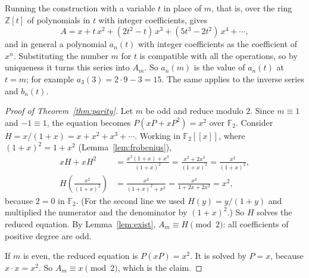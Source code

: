 \documentclass[11pt,a4paper]{article}
\theoremstyle{definition}
\theoremstyle{remark}
\newcommand{\Z}{\mathbb{Z}}
\newcommand{\F}{\mathbb{F}}
\newcommand{\ps}[1]{#1[[x]]}
\begin{document}
Running the construction with a variable $t$ in place of $m$, that is, over the ring $\Z[t]$ of polynomials in $t$ with
integer coefficients, gives
\[
A=x+t\,x^2+(2t^2-t)\,x^3+(5t^3-2t^2)\,x^4+\cdots,
\]
and in general a polynomial $a_n(t)$ with integer coefficients as the coefficient of $x^n$. Substituting the number $m$
for $t$ is compatible with all the operations, so by uniqueness it turns this series into $A_m$. So $a_n(m)$ is the value
of $a_n(t)$ at $t=m$; for example $a_3(3)=2\cdot9-3=15$. The same applies to the inverse series and $b_n(t)$.

\begin{proof}[Proof of Theorem~\ref{thm:parity}]
Let $m$ be odd and reduce modulo $2$. Since $m\equiv1$ and $-1\equiv1$, the equation becomes $P(xP+xP^2)=x^2$ over
$\F_2$. Consider $H=x/(1+x)=x+x^2+x^3+\cdots$. Working in $\ps{\F_2}$, where $(1+x)^2=1+x^2$ (Lemma~\ref{lem:frobenius}),
\begin{align*}
xH+xH^2&=\frac{x^2(1+x)+x^3}{(1+x)^2}=\frac{x^2+2x^3}{(1+x)^2}=\frac{x^2}{(1+x)^2},\\
H\!\left(\frac{x^2}{(1+x)^2}\right)&=\frac{x^2}{(1+x)^2+x^2}=\frac{x^2}{1+2x+2x^2}=x^2 ,
\end{align*}
because $2=0$ in $\F_2$. (For the second line we used $H(y)=y/(1+y)$ and multiplied the numerator and the denominator
by $(1+x)^2$.) So $H$ solves the reduced equation. By Lemma~\ref{lem:exist}, $A_m\equiv H\pmod2$: all
coefficients of positive degree are odd.

If $m$ is even, the reduced equation is $P(xP)=x^2$. It is solved by $P=x$, because $x\cdot x=x^2$. So $A_m\equiv
x\pmod2$, which is the claim.
\end{proof}
\end{document}
